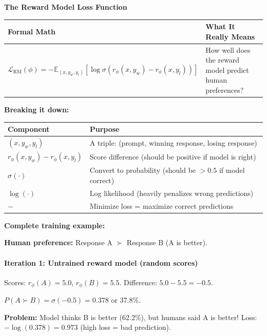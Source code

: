 \begin{chapterenv}
\begin{infobox}
\textbf{The Reward Model Loss Function}

\begin{center}
\begin{tabular}{p{}p{}}
\toprule
\textbf{Formal Math} & \textbf{What It Really Means} \\
\midrule
$\mathcal{L}_{\text{RM}}(\phi) = -\mathbb{E}_{(x,y_w,y_l)}\!\left[\log \sigma(r_\phi(x,y_w) - r_\phi(x,y_l))\right]$ & How well does the reward model predict human preferences? \\
\bottomrule
\end{tabular}
\end{center}

\textbf{Breaking it down:}

\begin{center}
\begin{tabular}{p{}p{}}
\toprule
\textbf{Component} & \textbf{Purpose} \\
\midrule
$(x, y_w, y_l)$ & A triple: (prompt, winning response, losing response) \\
$r_\phi(x, y_w) - r_\phi(x, y_l)$ & Score difference (should be positive if model is right) \\
$\sigma(\cdot)$ & Convert to probability (should be $> 0.5$ if model correct) \\
$\log(\cdot)$ & Log likelihood (heavily penalizes wrong predictions) \\
$-$ & Minimize loss = maximize correct predictions \\
\bottomrule
\end{tabular}
\end{center}
\end{infobox}

\textbf{Complete training example:}

\textbf{Human preference:} Response A $\succ$ Response B (A is better).

\paragraph{Iteration 1: Untrained reward model (random scores)}

Scores: $r_\phi(A) = 5.0$, $r_\phi(B) = 5.5$. Difference: $5.0 - 5.5 = -0.5$.

$P(A \succ B) = \sigma(-0.5) = 0.378$ or 37.8\%.

\textbf{Problem:} Model thinks B is better (62.2\%), but humans said A is better! Loss: $-\log(0.378) = 0.973$ (high loss = bad prediction).


\end{chapterenv}
